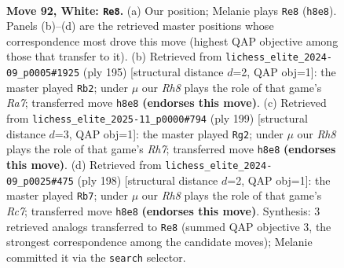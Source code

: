 \documentclass[11pt]{article}
\begin{document}
\clearpage

\begin{figure}[p]\centering
\begin{subfigure}{0.46\textwidth}\centering
\resizebox{\linewidth}{!}{%
\newchessgame
\chessboard[
  setfen={7R/k7/8/5K2/2N5/8/6P1/3r4 w - - 48 92},
  showmover=false,
  pgfstyle=straightmove, color=movearrow, markmove={h8-e8}
]}
\caption{}
\end{subfigure}\hfill
\begin{subfigure}{0.46\textwidth}\centering
\resizebox{\linewidth}{!}{%
\newchessgame
\chessboard[
  setfen={8/5k2/8/8/2n5/7R/r7/4K3 b - - 83 98},
  showmover=false,
  pgfstyle=straightmove, color=movearrow, markmove={a2-b2}
]}
\caption{}
\end{subfigure}
\\[4pt]
\begin{subfigure}{0.46\textwidth}\centering
\resizebox{\linewidth}{!}{%
\newchessgame
\chessboard[
  setfen={8/8/4R3/8/8/3n1k2/7r/K7 b - - 31 100},
  showmover=false,
  pgfstyle=straightmove, color=movearrow, markmove={h2-g2}
]}
\caption{}
\end{subfigure}\hfill
\begin{subfigure}{0.46\textwidth}\centering
\resizebox{\linewidth}{!}{%
\newchessgame
\chessboard[
  setfen={4k3/2R5/8/8/8/5P1K/8/r7 w - - 5 100},
  showmover=false,
  pgfstyle=straightmove, color=movearrow, markmove={c7-b7}
]}
\caption{}
\end{subfigure}
\caption{\textbf{Move 92, White: \texttt{Re8}.} (a) Our position; Melanie plays \texttt{Re8} (\texttt{h8e8}). Panels (b)--(d) are the retrieved master positions whose correspondence most drove this move (highest QAP objective among those that transfer to it). (b) Retrieved from \texttt{lichess\_elite\_2024-09\_p0005\#1925} (ply 195) [structural distance $d$=2, QAP obj=1]: the master played \texttt{Rb2}; under $\mu$ our \emph{Rh8} plays the role of that game's \emph{Ra7}; transferred move \texttt{h8e8} \textbf{(endorses this move)}. (c) Retrieved from \texttt{lichess\_elite\_2025-11\_p0000\#794} (ply 199) [structural distance $d$=3, QAP obj=1]: the master played \texttt{Rg2}; under $\mu$ our \emph{Rh8} plays the role of that game's \emph{Rh7}; transferred move \texttt{h8e8} \textbf{(endorses this move)}. (d) Retrieved from \texttt{lichess\_elite\_2024-09\_p0025\#475} (ply 198) [structural distance $d$=2, QAP obj=1]: the master played \texttt{Rb7}; under $\mu$ our \emph{Rh8} plays the role of that game's \emph{Rc7}; transferred move \texttt{h8e8} \textbf{(endorses this move)}. Synthesis: 3 retrieved analogs transferred to \texttt{Re8} (summed QAP objective 3, the strongest correspondence among the candidate moves); Melanie committed it via the \texttt{search} selector.}
\label{fig:thought-m182}
\end{figure}
\end{document}
